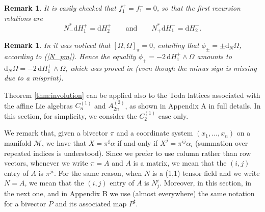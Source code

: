 \documentclass[12pt]{article}
\newtheorem{remark}[theorem]{Remark}
\newenvironment{rem}{\begin{remark} \rm}{\end{remark}}
\def\d{{\mathrm d}}
\def\M{{\mathcal M}}
\begin{document}
\begin{rem}
It is easily checked that $ f^+_1= f^-_1=0$, so that the first recursion relations are 
\begin{equation}
\label{gen-LM-chain-pm-first}
N_-^* \d H_1^+ = \d H_{2}^+ \qquad\mbox{and}\qquad
N_+^* \d H_1^- = \d H_{2}^- .
\end{equation}
\end{rem}

\begin{rem}
\label{rem:phi-pm}
In \cite{FMOP2020} it was noticed that $[\Omega,\Omega]_\pi=0$, entailing that $\phi_\pm=\pm\d_N\Omega$, according to (\ref{N_pm}).
Hence the equality $\phi_+=-2\,\d H_1^+\wedge\Omega$ amounts to $\d_N\Omega=-2\,\d H_1^+\wedge\Omega$, which was proved in 
\cite{FMOP2020} (even though the minus sign is missing due to a misprint).
\end{rem}


Theorem \ref{thm:involution} can be applied also to the Toda lattices associated with the affine Lie algebras $C_{n}^{(1)}$ and $A_{2n}^{(2)}$, as shown in Appendix A in full details. 
In this section, for simplicity, we consider the $C_2^{(1)}$ case only.

We remark that, given a bivector $\pi$ and a coordinate system 
$(x_1,\dots, x_n)$ on a manifold $\M$, we have that $X=\pi^\sharp\alpha$ if and only if $X^j=\pi^{ij}\alpha_i$ (summation over repeated indices is understood). 
Since we prefer to use column rather than row vectors, whenever we write $\pi%
=A$ and $A$ is a matrix, we mean that the $(i,j)$ entry of $A$ is $\pi^{ji}$. 
For the same reason, when $N$ is a (1,1) tensor field and we write $N=A$, %
we mean that the $(i,j)$ entry of $A$ is $N_j^i$. 
Moreover, in this section, in the next one, and in Appendix B we use (almost everywhere) the same notation for a bivector $P$ and its associated map $P^\sharp$.
\end{document}
